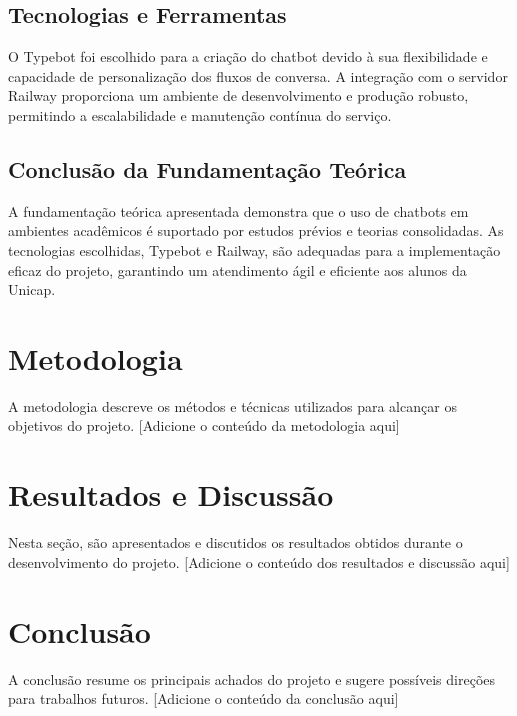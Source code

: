 \documentclass[12pt,a4paper]{article} %
\begin{document}
\subsection{Tecnologias e Ferramentas}

\noindent O Typebot foi escolhido para a criação do chatbot devido à sua flexibilidade e capacidade de personalização dos fluxos de conversa. A integração com o servidor Railway proporciona um ambiente de desenvolvimento e produção robusto, permitindo a escalabilidade e manutenção contínua do serviço.

\subsection{Conclusão da Fundamentação Teórica}

\noindent A fundamentação teórica apresentada demonstra que o uso de chatbots em ambientes acadêmicos é suportado por estudos prévios e teorias consolidadas. As tecnologias escolhidas, Typebot e Railway, são adequadas para a implementação eficaz do projeto, garantindo um atendimento ágil e eficiente aos alunos da Unicap.

\section{Metodologia}

\noindent A metodologia descreve os métodos e técnicas utilizados para alcançar os objetivos do projeto. [Adicione o conteúdo da metodologia aqui]

\section{Resultados e Discussão}

\noindent Nesta seção, são apresentados e discutidos os resultados obtidos durante o desenvolvimento do projeto. [Adicione o conteúdo dos resultados e discussão aqui]

\section{Conclusão}

\noindent A conclusão resume os principais achados do projeto e sugere possíveis direções para trabalhos futuros. [Adicione o conteúdo da conclusão aqui]

\newpage
\end{document}
